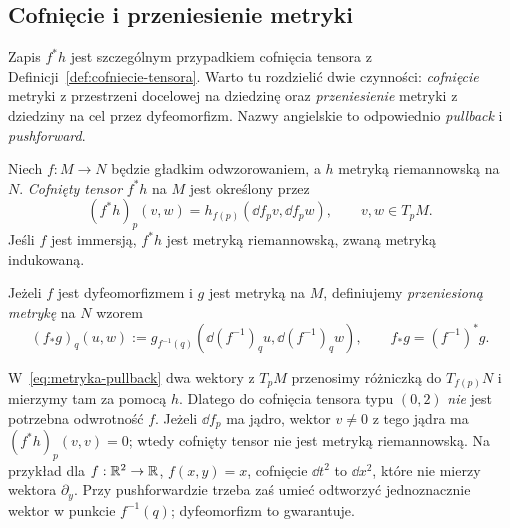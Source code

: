 \subsection*{Cofnięcie i przeniesienie metryki}

Zapis $f^*h$ jest szczególnym przypadkiem cofnięcia
tensora z Definicji~\ref{def:cofniecie-tensora}.
Warto tu rozdzielić dwie czynności: \emph{cofnięcie}
metryki z przestrzeni docelowej na dziedzinę oraz
\emph{przeniesienie} metryki z dziedziny na cel przez
dyfeomorfizm. Nazwy angielskie to odpowiednio
\emph{pullback} i \emph{pushforward}.

\begin{definicja}
\label{def:metryka-pullback-pushforward}
Niech $f:M\to N$ będzie gładkim odwzorowaniem, a $h$
metryką riemannowską na $N$. \emph{Cofnięty tensor}
$f^*h$ na $M$ jest określony przez
\begin{equation}\label{eq:metryka-pullback}
 (f^*h)_p(v,w)
 =h_{f(p)}(\dd f_pv,\dd f_pw),
 \qquad v,w\in T_pM.
\end{equation}
Jeśli $f$ jest immersją, $f^*h$ jest metryką
riemannowską, zwaną metryką indukowaną.

Jeżeli $f$ jest dyfeomorfizmem i $g$ jest metryką
na $M$, definiujemy \emph{przeniesioną metrykę}
na $N$ wzorem
\begin{equation}\label{eq:metryka-pushforward}
 (f_*g)_q(u,w)
 :=g_{f^{-1}(q)}(\dd(f^{-1})_q u,
                    \dd(f^{-1})_q w),
 \qquad f_*g=(f^{-1})^*g.
\end{equation}
\end{definicja}

W~\eqref{eq:metryka-pullback} dwa wektory z $T_pM$
przenosimy różniczką do $T_{f(p)}N$ i mierzymy tam
za pomocą $h$. Dlatego do cofnięcia tensora typu
$(0,2)$ \emph{nie} jest potrzebna odwrotność $f$.
Jeżeli $\dd f_p$ ma jądro, wektor $v\ne0$ z tego
jądra ma $(f^*h)_p(v,v)=0$; wtedy cofnięty tensor
nie jest metryką riemannowską. Na przykład dla
$f:\mathbb{R}^2\to\mathbb{R}$, $f(x,y)=x$, cofnięcie $\dd t^2$
to $\dd x^2$, które nie mierzy wektora $\partial_y$.
Przy pushforwardzie trzeba zaś umieć odtworzyć
jednoznacznie wektor w punkcie $f^{-1}(q)$;
dyfeomorfizm to gwarantuje.

